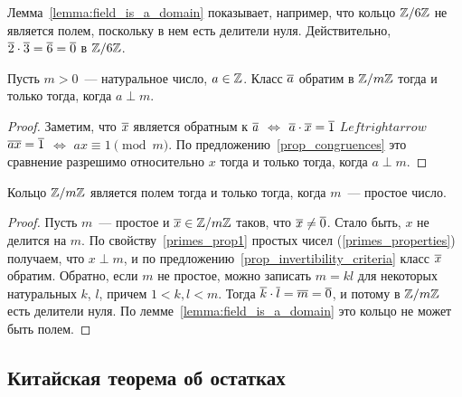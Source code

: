 Лемма~\ref{lemma:field_is_a_domain} показывает, например, что кольцо
$\mathbb Z/6\mathbb Z$ не является полем, поскольку в нем есть делители
нуля. Действительно, $\overline{2}\cdot\overline{3} = \overline{6} = \overline{0}$ в $\mathbb
Z/6\mathbb Z$.

\begin{proposition}\label{prop_invertibility_criteria}
Пусть $m>0$~--- натуральное число, $a\in\mathbb Z$. Класс $\overline{a}$ обратим
в $\mathbb Z/m\mathbb Z$ тогда и только тогда, когда $a\perp m$.
\end{proposition}
\begin{proof}
Заметим, что $\overline{x}$ является обратным к $\overline{a}$ $\Leftrightarrow$
$\overline{a}\cdot\overline{x}=\overline{1}$ $Leftrightarrow$
$\overline{ax}=\overline{1}$ $\Leftrightarrow$
$ax\equiv 1\pmod m$. По предложению~\ref{prop_congruences} это
сравнение разрешимо относительно $x$ тогда и только тогда, когда
$a\perp m$.
\end{proof}

\begin{proposition}\label{prop_zmz_field}
Кольцо $\mathbb Z/m\mathbb Z$ является полем тогда и только тогда, когда
$m$~--- простое число.
\end{proposition}
\begin{proof}
Пусть $m$~--- простое и $\overline{x}\in\mathbb Z/m\mathbb Z$ таков, что
$\overline{x}\neq\overline{0}$.
Стало быть, $x$ не делится на $m$. По свойству~\ref{primes_prop1}
простых чисел (\ref{primes_properties}) получаем, что $x\perp m$, и по
предложению~\ref{prop_invertibility_criteria} класс $\overline{x}$ обратим.
Обратно, если $m$ не простое, можно записать $m=kl$ для некоторых
натуральных $k$, $l$, причем $1 < k,l < m$.
Тогда $\overline{k}\cdot\overline{l} = \overline{m} = \overline{0}$, и потому в $\mathbb Z/m\mathbb Z$
есть делители нуля. По лемме~\ref{lemma:field_is_a_domain} это кольцо
не может быть полем.
\end{proof}

\subsection{Китайская теорема об остатках}


